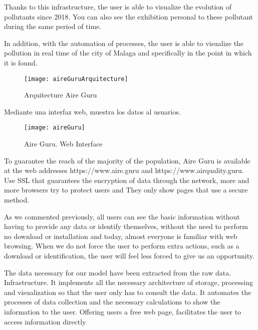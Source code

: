 Thanks to this infrastructure, the user is able to visualize the evolution of pollutants since 2018. You can also see the exhibition
personal to these pollutant during the same period of time.

In addition, with the automation of processes, the user is able to visualize the pollution in real time of the city of Malaga and specifically in the point
in which it is found. \\

\begin{figure}[ht]
    \centering
    \texttt{[image: aireGuruArquitecture]}
    \caption{Arquitecture Aire Guru}
\end{figure}

Mediante una interfaz web, muestra los datos al usuarios.\\

\begin{figure}[ht]
    \centering
    \texttt{[image: aireGuru]}
    \caption{Aire Guru. Web Interface}
\end{figure}

To guarantee the reach of the majority of the population, Aire Guru is available at the web addresses https://www.aire.guru and https://www.airquality.guru.
Use SSL that guarantees the encryption of data through the network, more and more browsers try to protect users and
They only show pages that use a secure method.

As we commented previously, all users can see the basic information without having to provide any data or identify themselves, without the need to
perform no download or installation and today, almost everyone is familiar with web browsing.
When we do not force the user to perform extra actions, such as a download or identification, the user will feel less forced to give us an opportunity.


\begin{itemize}
\done The data necessary for our model have been extracted from the raw data.
\done Infrastructure. It implements all the necessary architecture of storage, processing and visualization so that the user only has to consult
the data.
\done It automates the processes of data collection and the necessary calculations to show the information to the user.
\done Offering users a free web page, facilitates the user to access information directly
\end{itemize}

